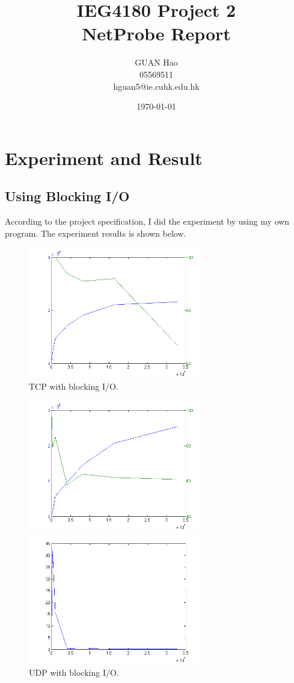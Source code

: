 \documentclass[11pt]{article}
\title{IEG4180 Project 2\\NetProbe Report}
\author{GUAN Hao\\05569511\\hguan5@ie.cuhk.edu.hk}
\date{\today}
\begin{document}
\maketitle
\section{Experiment and Result}
\subsection{Using Blocking I/O}
According to the project specification, I did the experiment by using my own program. The experiment results is shown below.

\begin{figure}
\centering
\includegraphics[width=3in]{tcp-blocking.png}
\caption{TCP with blocking I/O.}
\label{fig:TCP}
\end{figure}

\begin{figure}
\begin{minipage}[c]{0.5\textwidth} 
\centering 
\includegraphics[width=3in]{udp-blocking.png} 
\end{minipage}%
\begin{minipage}[c]{0.5\textwidth} 
\centering 
\includegraphics[width=3in]{udp-blocking-lost.png}
\end{minipage}%
\caption{UDP with blocking I/O.}
\label{fig:TCP}
\end{figure}
\end{document}
